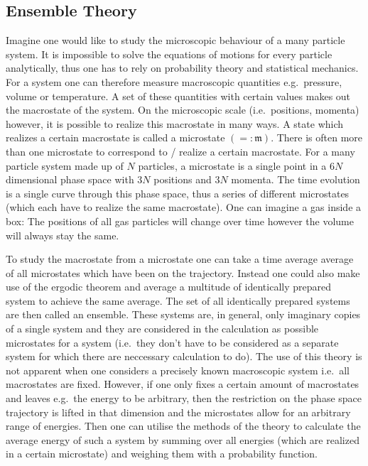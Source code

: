 \documentclass[a4paper,10pt]{article}
\numberwithin{equation}{section}
\begin{document}
\begin{multicols}{2}



\section{Ensemble Theory}
Imagine one would like to study the microscopic behaviour of a many particle system.
It is impossible to solve the equations of motions for every particle analytically, thus one has to rely on probability theory and statistical mechanics.
For a system one can therefore measure macroscopic quantities e.g.\ pressure, volume or temperature.
A set of these quantities with certain values makes out the macrostate of the system.
On the microscopic scale (i.e.\ positions, momenta) however, it is possible to realize this macrostate in many ways.
A state which realizes a certain macrostate is called a microstate $\left(=:\mathfrak{m}\right)$.
There is often more than one microstate to correspond to / realize a certain macrostate.
For a many particle system made up of $N$ particles, a microstate is a single point in a $6N$ dimensional phase space with $3N$ positions and $3N$ momenta.
The time evolution is a single curve through this phase space, thus a series of different microstates (which each have to realize the same macrostate).
One can imagine a gas inside a box: The positions of all gas particles will change over time however the volume will always stay the same.

To study the macrostate from a microstate one can take a time average average of all microstates which have been on the trajectory.
Instead one could also make use of the ergodic theorem and average a multitude of identically prepared system to achieve the same average.
The set of all identically prepared systems are then called an ensemble.
These systems are, in general, only imaginary copies of a single system and they are considered in the calculation as possible microstates for a system (i.e.\ they don't have to be considered as a separate system for which there are neccessary calculation to do).
The use of this theory is not apparent when one considers a precisely known macroscopic system i.e.\ all macrostates are fixed.
However, if one only fixes a certain amount of macrostates and leaves e.g.\ the energy to be arbitrary, then the restriction on the phase space trajectory is lifted in that dimension and the microstates allow for an arbitrary range of energies.
Then one can utilise the methods of the theory to calculate the average energy of such a system by summing over all energies (which are realized in a certain microstate) and weighing them with a probability function.


\end{multicols}
\end{document}
